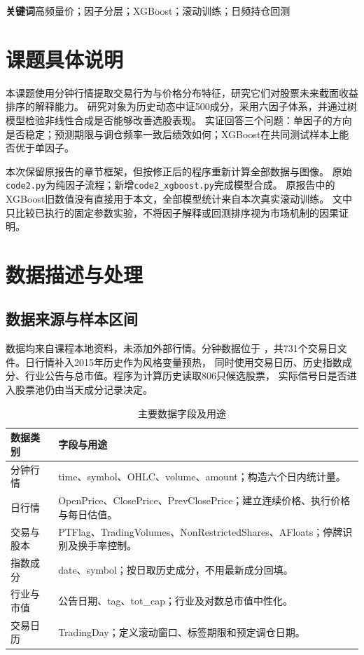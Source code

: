 \documentclass[UTF8,zihao=-4,fontset=fandol]{ctexart}
\begin{document}
\noindent\textbf{关键词}\quad 高频量价；因子分层；XGBoost；滚动训练；日频持仓回测
\vspace{3mm}
\tableofcontents

\clearpage
\section{课题具体说明}
本课题使用分钟行情提取交易行为与价格分布特征，研究它们对股票未来截面收益排序的解释能力。
研究对象为历史动态中证500成分，采用六因子体系，并通过树模型检验非线性合成是否能够改善选股表现。
实证回答三个问题：单因子的方向是否稳定；预测期限与调仓频率一致后绩效如何；XGBoost在共同测试样本上能否优于单因子。

本次保留原报告的章节框架，但按修正后的程序重新计算全部数据与图像。
原始\texttt{code2.py}为纯因子流程；新增\texttt{code2\_xgboost.py}完成模型合成。
原报告中的XGBoost旧数值没有直接用于本文，全部模型统计来自本次真实滚动训练。
文中只比较已执行的固定参数实验，不将因子解释或回测排序视为市场机制的因果证明。

\section{数据描述与处理}
\subsection{数据来源与样本区间}
数据均来自课程本地资料，未添加外部行情。分钟数据位于
，共731个交易日文件。日行情补入2015年历史作为风格变量预热，
同时使用交易日历、历史指数成分、行业公告与总市值。程序为计算历史读取806只候选股票，
实际信号日是否进入股票池仍由当天成分记录决定。

\begin{table}[H]\centering\small
\caption{主要数据字段及用途}
\begin{tabularx}{\linewidth}{p{28mm}X}
\toprule 数据类别 & 字段与用途\\\midrule
分钟行情 & time、symbol、OHLC、volume、amount；构造六个日内统计量。\\
日行情 & OpenPrice、ClosePrice、PrevClosePrice；建立连续价格、执行价格与每日估值。\\
交易与股本 & PTFlag、TradingVolumes、NonRestrictedShares、AFloats；停牌识别及换手率控制。\\
指数成分 & date、symbol；按日取历史成分，不用最新成分回填。\\
行业与市值 & 公告日期、tag、tot\_cap；行业及对数总市值中性化。\\
交易日历 & TradingDay；定义滚动窗口、标签期限和预定调仓日期。\\\bottomrule
\end{tabularx}\end{table}
\end{document}
